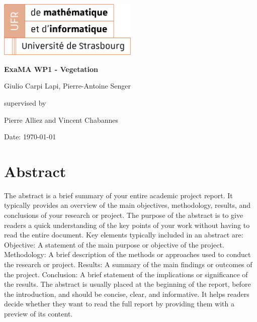 \documentclass[12pt]{article}
\begin{document}
\begin{titlepage}
    \centering
    \includegraphics[width=0.5\textwidth]{images/logo_ufr.png}\par\vspace{1cm}
    \vspace{1.5cm}
    {\huge\bfseries ExaMA WP1 - Vegetation\par}
    \vspace{2cm}
    {\Large Giulio Carpi Lapi, Pierre-Antoine Senger\par}
    \vfill
    supervised by\par
    Pierre Alliez and Vincent Chabannes

    \vfill

    {\large Date: \today\par}
\end{titlepage}

\tableofcontents
\newpage

\section{Abstract}
The abstract is a brief summary of your entire academic project report.
It typically provides an overview of the main objectives, methodology,
results, and conclusions of your research or project.
The purpose of the abstract is to give readers a quick understanding
of the key points of your work without having to read the entire document.
Key elements typically included in an abstract are:
Objective: A statement of the main purpose or objective of the project.
Methodology: A brief description of the methods or approaches
used to conduct the research or project.
Results: A summary of the main findings or outcomes of the project.
Conclusion: A brief statement of the implications or significance of the results.
The abstract is usually placed at the beginning of the report,
before the introduction, and should be concise, clear, and informative.
It helps readers decide whether they want to read the full report
by providing them with a preview of its content.
\end{document}
